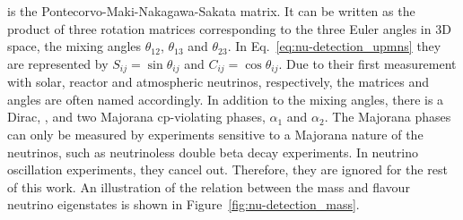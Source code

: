 is the Pontecorvo-Maki-Nakagawa-Sakata matrix.
It can be written as the product of three rotation matrices corresponding to the three Euler angles in 3D space, the mixing angles $\theta_{12}$, $\theta_{13}$ and $\theta_{23}$.
In Eq.~\eqref{eq:nu-detection_upmns} they are represented by $S_{ij} = \sin{\theta_{ij}}$ and $C_{ij} = \cos{\theta_{ij}}$.
Due to their first measurement with solar, reactor and atmospheric neutrinos, respectively, the matrices and angles are often named accordingly.
In addition to the mixing angles, there is a Dirac, \dcp, and two Majorana \gls{cp}-violating phases, $\alpha_1$ and $\alpha_2$.
The Majorana phases can only be measured by experiments sensitive to a Majorana nature of the neutrinos, such as neutrinoless double beta decay experiments.
In neutrino oscillation experiments, they cancel out.
Therefore, they are ignored for the rest of this work.
An illustration of the relation between the mass and flavour neutrino eigenstates is shown in Figure~\ref{fig:nu-detection_mass}.

